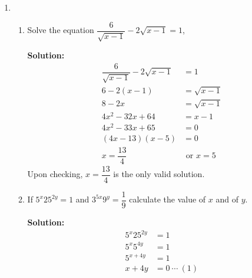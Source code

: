 \documentclass{report}
\newcommand{\sol}{\vspace{0.2cm}\textbf{Solution:}\vspace{0.2cm}}
\begin{document}
\begin{multicols*}{2}
\begin{enumerate}[leftmargin=*]
        \item \begin{enumerate}
                  \item Solve the equation $\dfrac{6}{\sqrt{x-1}}-2 \sqrt{x-1}=1$,

                        \sol{}
                        \begin{align*}
                            \dfrac{6}{\sqrt{x-1}} - 2\sqrt{x-1} & = 1               \\
                            6 - 2(x-1)                          & = \sqrt{x-1}      \\
                            8 - 2x                              & = \sqrt{x-1}      \\
                            4x^2 - 32x + 64                     & = x - 1           \\
                            4x^2 - 33x + 65                     & = 0               \\
                            (4x - 13)(x - 5)                    & = 0               \\
                            x = \dfrac{13}{4}                   & \text{ or } x = 5
                        \end{align*}
                        Upon checking, $x=\dfrac{13}{4}$ is the only valid solution.

                  \item If $5^{x} 25^{2 y}=1$ and $3^{5 x} 9^{y}=\dfrac{1}{9}$ calculate the value of
                        $x$ and of $y$.

                        \sol{}
                        \begin{align*}
                            5^x 25^{2y} & = 1              \\
                            5^x 5^{4y}  & = 1              \\
                            5^{x+4y}    & = 1              \\
                            x + 4y      & = 0\ \cdots\ (1)
                        \end{align*}


\end{enumerate}
\end{enumerate}
\end{multicols*}
\end{document}

